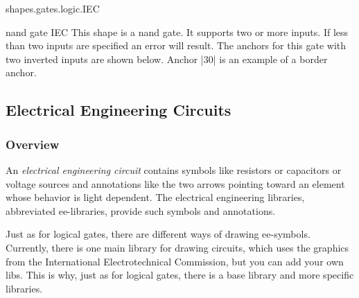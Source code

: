 \begin{pgflibrary}{shapes.gates.logic.IEC}
    \begin{shape}{nand gate IEC}
        This shape is a nand gate. It supports two or more inputs. If less than
        two inputs are specified an error will result. The anchors for this
        gate with two inverted inputs are shown below. Anchor |30| is an
        example of a border anchor.
\begin{codeexample}[preamble={\usetikzlibrary{circuits.logic.IEC}}]
\Huge
{}
\end{codeexample}
    \end{shape}
\end{pgflibrary}


\subsection{Electrical Engineering Circuits}

\subsubsection{Overview}

An \emph{electrical engineering circuit} contains symbols like resistors or
capacitors or voltage sources and annotations like the two arrows pointing
toward an element whose behavior is light dependent. The electrical engineering
libraries, abbreviated ee-libraries, provide such symbols and annotations.

Just as for logical gates, there are different ways of drawing ee-symbols.
Currently, there is one main library for drawing circuits, which uses the
graphics from the International Electrotechnical Commission, but you can add
your own libs. This is why, just as for logical gates, there is a base library
and more specific libraries.

